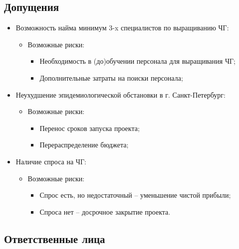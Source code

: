 \documentclass[a4paper,8pt]{article}
\begin{document}
\subsection*{Допущения}

    \begin{itemize}
        \item Возможность найма минимум 3-x специалистов по выращиванию ЧГ:
            \begin{itemize}
                \item Возможные риски:
                    \begin{itemize}
                        \item Необходимость в (до)обучении персонала для выращивания ЧГ;
                        \item Дополнительные затраты на поиски персонала;
                    \end{itemize}
            \end{itemize}
        
        \item Неухудшение эпидемиологической обстановки в г. Санкт-Петербург:
            \begin{itemize}
                \item Возможные риски:
                    \begin{itemize}
                        \item Перенос сроков запуска проекта;
                        \item Перераспределение бюджета;
                    \end{itemize}  
            \end{itemize}
        \item Наличие спроса на ЧГ:
            \begin{itemize}
                \item Возможные риски:
                    \begin{itemize}
                        \item Спрос есть, но недостаточный -- уменьшение чистой прибыли;
                        \item Спроса нет -- досрочное закрытие проекта.
                    \end{itemize}
            \end{itemize}
    \end{itemize}


\subsection*{Ответственные лица}
\end{document}

